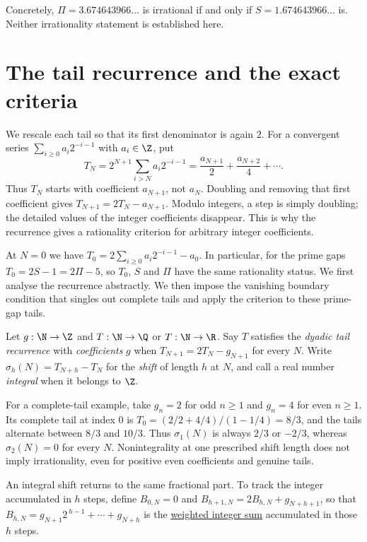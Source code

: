Concretely, $\Pi=3.674643966\ldots$ is irrational
if and only if $S=1.674643966\ldots$ is.  Neither irrationality statement is established here.

\section{The tail recurrence and the exact criteria}\label{long251:sec:tail}

We rescale each tail so that its first denominator is again $2$.
For a convergent series $\sum_{i\ge0}a_i2^{-i-1}$ with $a_i\in\Z$,
put
\[
 T_N=2^{N+1}\sum_{i>N}a_i2^{-i-1}
    =\frac{a_{N+1}}2+\frac{a_{N+2}}4+\cdots.
\]
Thus $T_N$ starts with coefficient $a_{N+1}$, not $a_N$.  Doubling
and removing that first coefficient gives
$T_{N+1}=2T_N-a_{N+1}$.  Modulo integers, a step is simply doubling;
the detailed values of the integer coefficients disappear.  This is
why the recurrence gives a rationality criterion for arbitrary integer
coefficients.

At $N=0$ we have
$T_0=2\sum_{i\ge0}a_i2^{-i-1}-a_0$.  In particular, for the prime
gaps $T_0=2S-1=2\Pi-5$, so $T_0$, $S$ and $\Pi$ have the same
rationality status.  We first analyse the recurrence abstractly.
We then impose the vanishing boundary condition that singles out
complete tails and apply the criterion to these prime-gap tails.

\begin{definition}\label{long251:def:rec}
Let $g:\N\to\Z$ and $T:\N\to\Q$ or $T:\N\to\R$.  Say $T$ satisfies the
\emph{dyadic tail recurrence} with \emph{coefficients} $g$ when
$T_{N+1}=2T_N-g_{N+1}$ for every $N$.  Write $\sigma_h(N)=T_{N+h}-T_N$ for the
\emph{shift} of length $h$ at $N$, and call a real number \emph{integral}
when it belongs to $\Z$.
\end{definition}

For a complete-tail example, take $g_n=2$ for odd $n\ge1$ and $g_n=4$
for even $n\ge1$.  Its complete tail at index $0$ is
$T_0=(2/2+4/4)/(1-1/4)=8/3$, and the tails alternate between
$8/3$ and $10/3$.  Thus $\sigma_1(N)$ is always $2/3$ or $-2/3$,
whereas $\sigma_2(N)=0$ for every $N$.  Nonintegrality at one prescribed
shift length does not imply irrationality, even for positive even
coefficients and genuine tails.

An integral shift returns to the same fractional part.  To track the
integer accumulated in $h$ steps, define $B_{0,N}=0$ and
$B_{h+1,N}=2B_{h,N}+g_{N+h+1}$,
so that $B_{h,N}=g_{N+1}2^{\,h-1}+\cdots+g_{N+h}$ is the
\href{https://github.com/wcook04/plectis-erdos/blob/3d6d938d696fed0fb71dd55115a18a73738ff223/lean/ErdosProblems/Erdos251/PrimeGapDyadicTail.lean\#L647}{weighted integer sum}
accumulated in those $h$ steps.

